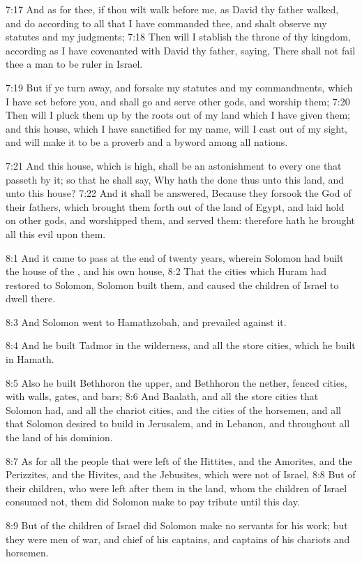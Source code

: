 7:17 And as for thee, if thou wilt walk before me, as David thy father
walked, and do according to all that I have commanded thee, and shalt
observe my statutes and my judgments; 7:18 Then will I stablish the
throne of thy kingdom, according as I have covenanted with David thy
father, saying, There shall not fail thee a man to be ruler in Israel.

7:19 But if ye turn away, and forsake my statutes and my commandments,
which I have set before you, and shall go and serve other gods, and
worship them; 7:20 Then will I pluck them up by the roots out of my
land which I have given them; and this house, which I have sanctified
for my name, will I cast out of my sight, and will make it to be a
proverb and a byword among all nations.

7:21 And this house, which is high, shall be an astonishment to every
one that passeth by it; so that he shall say, Why hath the \LORD done
thus unto this land, and unto this house?  7:22 And it shall be
answered, Because they forsook the \LORD God of their fathers, which
brought them forth out of the land of Egypt, and laid hold on other
gods, and worshipped them, and served them: therefore hath he brought
all this evil upon them.

8:1 And it came to pass at the end of twenty years, wherein Solomon
had built the house of the \LORD, and his own house, 8:2 That the
cities which Huram had restored to Solomon, Solomon built them, and
caused the children of Israel to dwell there.

8:3 And Solomon went to Hamathzobah, and prevailed against it.

8:4 And he built Tadmor in the wilderness, and all the store cities,
which he built in Hamath.

8:5 Also he built Bethhoron the upper, and Bethhoron the nether,
fenced cities, with walls, gates, and bars; 8:6 And Baalath, and all
the store cities that Solomon had, and all the chariot cities, and the
cities of the horsemen, and all that Solomon desired to build in
Jerusalem, and in Lebanon, and throughout all the land of his
dominion.

8:7 As for all the people that were left of the Hittites, and the
Amorites, and the Perizzites, and the Hivites, and the Jebusites,
which were not of Israel, 8:8 But of their children, who were left
after them in the land, whom the children of Israel consumed not, them
did Solomon make to pay tribute until this day.

8:9 But of the children of Israel did Solomon make no servants for his
work; but they were men of war, and chief of his captains, and
captains of his chariots and horsemen.

